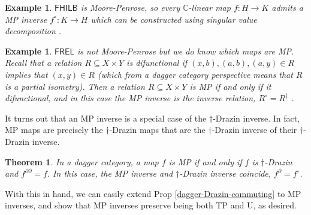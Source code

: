 \documentclass[submission,copyright,creativecommons]{eptcs}
\newtheorem{theorem}[observation]{Theorem}
\newtheorem{example}[observation]{Example}
\begin{document}
\begin{example} $\mathsf{FHILB}$ is Moore-Penrose, so every $\mathbb{C}$-linear map $f: H \to K$ admits a MP inverse $f^\circ: K \to H$ which can be constructed using singular value decomposition \cite[Ex 2.13]{Cockett2023Moore}. 
\end{example}

\begin{example} $\mathsf{FREL}$ is not Moore-Penrose but we do know which maps are MP. Recall that a relation $R \subseteq X \times Y$ is \textit{difunctional} if $(x,b),(a,b),(a,y) \in R$ implies that $(x,y) \in R$ (which from a dagger category perspective means that $R$ is a partial isometry). Then a relation $R \subseteq X \times Y$ is MP if and only if it difunctional, and in this case the MP inverse is the inverse relation, $R^\circ = R^\dagger$ \cite[Ex 2.14]{Cockett2023Moore}. 
\end{example}

It turns out that an MP inverse is a special case of the $\dagger$-Drazin inverse. In fact, MP maps are precisely the $\dagger$-Drazin maps that are the $\dagger$-Drazin inverse of their $\dagger$-Drazin inverse. 

\begin{theorem}\label{thm:MP=a-dag-Drazin} \cite[Thm 4.2]{cockett2025dagger} In a dagger category, a map $f$ is MP if and only if $f$ is $\dagger$-Drazin and $f^{\partial \partial} = f$. In this case, the MP inverse and $\dagger$-Drazin inverse coincide, $f^\partial = f^\circ$. 
\end{theorem}

With this in hand, we can easily extend Prop \ref{dagger-Drazin-commuting} to MP inverses, and show that MP inverses preserve being both TP and U, as desired. 
\end{document}

